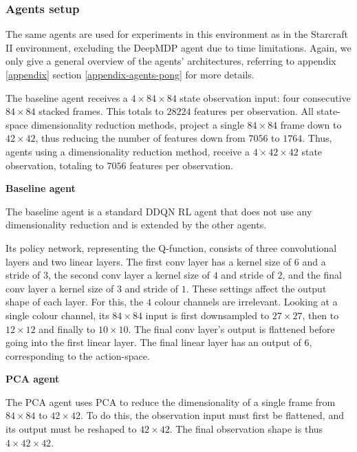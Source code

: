 \subsubsection*{Agents setup}
The same agents are used for experiments in this environment as in the Starcraft II environment, excluding the DeepMDP agent due to time limitations. Again, we only give a general overview of the agents' architectures, referring to appendix \ref{appendix} section \ref{appendix-agents-pong} for more details.

The baseline agent receives a $4 \times 84 \times 84$ state observation input: four consecutive $84 \times 84$ stacked frames. This totals to $28224$ features per observation. All state-space dimensionality reduction methods, project a single $84 \times 84$ frame down to $42 \times 42$, thus reducing the number of features down from $7056$ to $1764$. Thus, agents using a dimensionality reduction method, receive a $4 \times 42 \times 42$ state observation, totaling to $7056$ features per observation. \newline\par

\noindent \textbf{Baseline agent}\par
\noindent The baseline agent is a standard DDQN RL agent that does not use any dimensionality reduction and is extended by the other agents.

Its policy network, representing the Q-function, consists of three convolutional layers and two linear layers. The first conv layer has a kernel size of $6$ and a stride of $3$, the second conv layer a kernel size of $4$ and stride of $2$, and the final conv layer a kernel size of $3$ and stride of $1$. These settings affect the output shape of each layer. For this, the $4$ colour channels are irrelevant. Looking at a single colour channel, its $84 \times 84$ input is first downsampled to $27 \times 27$, then to $12 \times 12$ and finally to $10 \times 10$. The final conv layer's output is flattened before going into the first linear layer. The final linear layer has an output of $6$, corresponding to the action-space.\newline\par

\noindent \textbf{PCA agent}\par
\noindent The PCA agent uses PCA to reduce the dimensionality of a single frame from $84 \times 84$ to $42 \times 42$. To do this, the observation input must first be flattened, and its output must be reshaped to $42 \times 42$. The final observation shape is thus $4 \times 42 \times 42$.

